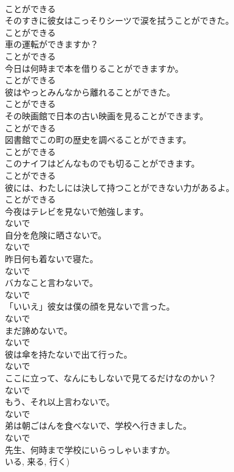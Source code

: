 \documentclass[8pt]{extreport}
\begin{document}
\begin{CJK}{UTF8}{min}
\\	ことができる
\\	そのすきに彼女はこっそりシーツで涙を拭うことができた。	
\\	ことができる
\\	車の運転ができますか？	
\\	ことができる
\\	今日は何時まで本を借りることができますか。	
\\	ことができる
\\	彼はやっとみんなから離れることができた。	
\\	ことができる
\\	その映画館で日本の古い映画を見ることができます。	
\\	ことができる
\\	図書館でこの町の歴史を調べることができます。	
\\	ことができる
\\	このナイフはどんなものでも切ることができます。	
\\	ことができる
\\	彼には、わたしには決して持つことができない力があるよ。	
\\	ことができる
\\	今夜はテレビを見ないで勉強します。	
\\	ないで
\\	自分を危険に晒さないで。	
\\	ないで
\\	昨日何も着ないで寝た。	
\\	ないで
\\	バカなこと言わないで。	
\\	ないで
\\	「いいえ」彼女は僕の顔を見ないで言った。	
\\	ないで
\\	まだ諦めないで。	
\\	ないで
\\	彼は傘を持たないで出て行った。	
\\	ないで
\\	ここに立って、なんにもしないで見てるだけなのかい？	
\\	ないで
\\	もう、それ以上言わないで。	
\\	ないで
\\	弟は朝ごはんを食べないで、学校へ行きました。	
\\	ないで
\\	先生、何時まで学校にいらっしゃいますか。	
\\	いる, 来る, 行く)	

\end{CJK}
\end{document}
